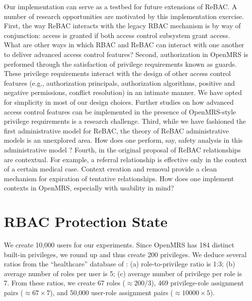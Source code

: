\documentclass{acm_proc_article-sp}
\begin{document}
Our implementation can serve as a testbed for future extensions of
ReBAC.  A number of research opportunities are motivated by this
implementation exercise.  First, the way ReBAC interacts with the
legacy RBAC mechanism is by way of conjunction: access is granted if
both access control subsystem grant access.  What are other ways in
which RBAC and ReBAC can interact with one another to deliver advanced
access control features?  Second, authorization in OpenMRS is
performed through the satisfaction of privilege requirements known as
guards.  These privilege requirements interact with the design of
other access control features (e.g., authorization principals,
authorization algorithms, positive and negative permissions, conflict
resolution) in an intimate manner.  We have opted for simplicity in
most of our design choices.  Further studies on how advanced access
control features can be implemented in the presence of OpenMRS-style
privilege requirements is a research challenge.  Third, while we have
fashioned the first administrative model for ReBAC, the theory of
ReBAC administrative models is an unexplored area.  How does one
perform, say, safety analysis in this administrative model \cite{HRU}?
Fourth, in the original proposal of ReBAC \cite{Fong:2011}
relationships are contextual.  For example, a referral relationship is
effective only in the context of a certain medical case.  Context
creation and removal provide a clean mechanism for expiration of
tentative relationships.  How does one implement contexts in OpenMRS,
especially with usability in mind?


  






\appendix


\section{RBAC Protection State}
\label{app-RBAC}

We create 10,000 users for our experiments.  Since OpenMRS has 184
distinct built-in privileges, we round up and thus create 200
privileges.  We deduce several ratios from the ``healthcare'' database
of \cite{Ene-et-al:2008}: (a) role-to-privilege ratio is 1:3; (b)
average number of roles per user is 5; (c) average number of privilege
per role is 7.  From these ratios, we create 67 roles ($\approx
200/3$), 469 privilege-role assignment pairs ($\approx 67 \times 7$),
and 50,000 user-role assignment pairs ($\approx 10000 \times 5$).
\end{document}
